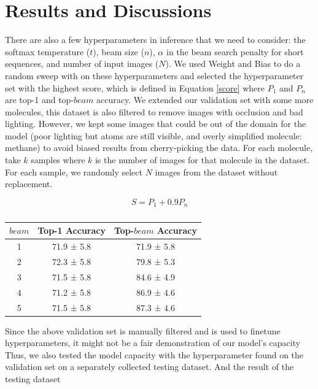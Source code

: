 \documentclass{article}
\begin{document}
\section{Results and Discussions} 
There are also a few hyperparameters in inference that we need to consider: the softmax temperature ($t$), beam size ($n$), $\alpha$ in the beam search penalty for short sequences, and number of input images ($N$). We used Weight and Bias \cite{wandb} to do a random sweep with on these hyperparameters and selected the hyperparameter set with the highest score, which is defined in Equation \ref{score} where $P_{1}$ and $P_{n}$ are top-1 and top-$beam$ accuracy. We extended our validation set with some more molecules, this dataset is also filtered to remove images with occlusion and bad lighting. However, we kept some images that could be out of the domain for the model (poor lighting but atoms are still visible, and overly simplified molecule: methane) to avoid biased results from cherry-picking the data. For each molecule, take $k$ samples where $k$ is the number of images for that molecule in the dataset. For each sample, we randomly select $N$ images from the dataset without replacement. 


\begin{equation}
S = P_{1} + 0.9P_{n}
\label{score}
\end{equation}

\begin{table}[]
    \centering
    \begin{tabular}{c|cc}
      $beam$ & Top-1 Accuracy & Top-$beam$ Accuracy \\ \hline
      1 & 71.9 ± 5.8 & 71.9 ± 5.8 \\ 2 & 72.3 ± 5.8 & 79.8 ± 5.3 \\ 3 & 71.5 ± 5.8 & 84.6 ± 4.9 \\ 4 & 71.2 ± 5.8 & 86.9 ± 4.6 \\ 5 & 71.5 ± 5.8 & 87.3 ± 4.6
    \end{tabular}
    \caption{}
    \label{tab:my_label}
\end{table}

Since the above validation set is manually filtered and is used to finetune hyperparameters, it might not be a fair demonstration of our model's capacity Thus, we also tested the model capacity with the hyperparameter found on the validation set on a separately collected testing dataset. And the result of the testing dataset 
\end{document}
